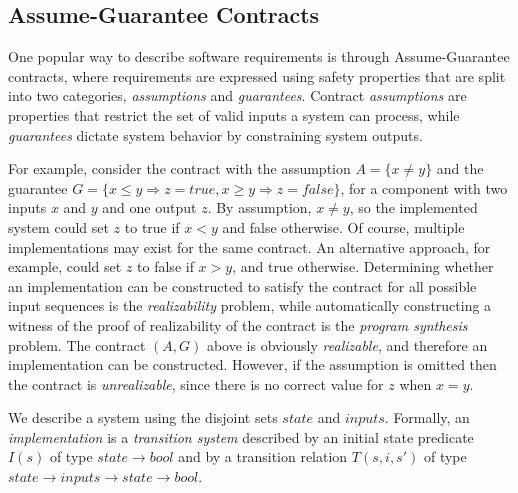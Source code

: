 \vspace{-.5em}
\subsection{Assume-Guarantee Contracts}
\label{sec:pre}
\vspace{-.5em}

One popular way to describe software requirements is through Assume-Guarantee
contracts, where requirements are expressed using safety properties that are
split into two categories, \emph{assumptions} and \emph{guarantees}.
Contract \emph{assumptions} are properties that restrict the set of valid inputs
a system can process, while \emph{guarantees} dictate system behavior by constraining system outputs.

For example, consider the contract with the assumption $A = \{x\neq
y\}$ and the guarantee $G = \{x \leq y \Longrightarrow z =
\textit{true}, x \geq y \Longrightarrow z = \textit{false}\}$, for a component with two inputs $x$ and $y$ and one output $z$.  By assumption, $x \neq y$, so the implemented system could set $z$ to true if $x < y$ and false otherwise.  %
Of course, multiple implementations may exist for the same contract. An
alternative approach, for example, could set $z$ to false if $x > y$, and true
otherwise. Determining whether an implementation can be constructed to satisfy
the contract for all possible input sequences is the \emph{realizability} problem, while automatically constructing a witness of the proof of realizability of the contract is the \emph{program synthesis} problem.  The contract $(A,G)$ above is obviously \emph{realizable}, and therefore an implementation can be constructed.
However, if the assumption is omitted then the contract is \emph{unrealizable}, since there is no correct value for $z$ when $x=y$.


We describe a system using the disjoint sets $state$ and $inputs$.
Formally, an \emph{implementation} is a \emph{transition system}
described by an initial state predicate $I(s)$ of type $state \to
bool$ and by a transition relation $T(s,i,s')$ of type $state \to
inputs \to state \to bool$.


